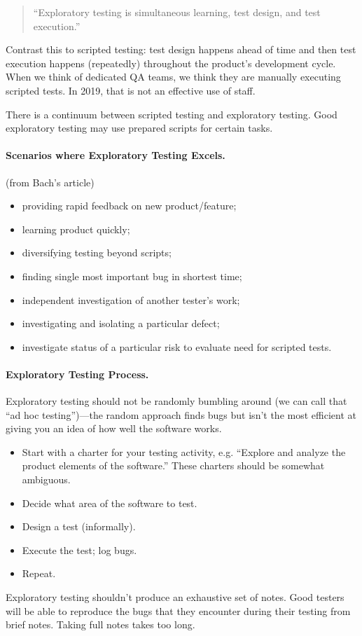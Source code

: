 \documentclass[11pt]{article}
\begin{document}
\begin{quote}
``Exploratory testing is simultaneous learning, test design, and test execution.''
\end{quote}
Contrast this to scripted testing: test design
happens ahead of time and then test execution happens (repeatedly)
throughout the product's development cycle. When we think of
dedicated QA teams, we think they are manually executing scripted
tests. In 2019, that is not an effective use of staff.

There is a continuum between scripted testing and exploratory testing.
Good exploratory testing may use prepared scripts for certain tasks.

\paragraph{Scenarios where Exploratory Testing Excels.} (from Bach's article)
\begin{itemize}[noitemsep]
\item providing rapid feedback on new product/feature;
\item learning product quickly;
\item diversifying testing beyond scripts;
\item finding single most important bug in shortest time;
\item independent investigation of another tester's work;
\item investigating and isolating a particular defect;
\item investigate status of a particular risk to evaluate need for scripted tests.
\end{itemize}

\paragraph{Exploratory Testing Process.} Exploratory testing should not be
randomly bumbling around (we can call that ``ad hoc testing'')---the random
approach finds bugs but isn't the most efficient at giving you an idea of how well
the software works.

\begin{itemize}[noitemsep]
\item Start with a charter for your testing activity, e.g. ``Explore and analyze the product elements of the software.'' 
These charters should be somewhat ambiguous.
\item Decide what area of the software to test.
\item Design a test (informally).
\item Execute the test; log bugs.
\item Repeat.
\end{itemize}
Exploratory testing shouldn't produce an exhaustive set of notes. Good testers will
be able to reproduce the bugs that they encounter during their testing from brief notes.
Taking full notes takes too long.
\end{document}
